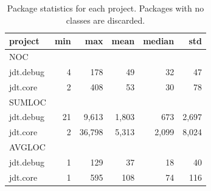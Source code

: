 \begin{table}[!ht]\footnotesize
	\centering
	\begin{tabular}{lrrrrr}
		\toprule
		project & min & max & mean & median & std \\
		\midrule
		NOC\\
		\midrule
		jdt.debug & 4 & 178 & 49 & 32 & 47 \\
		jdt.core & 2 & 408 & 53 & 30 & 78 \\
		\midrule
		SUMLOC\\
		\midrule
		jdt.debug & 21 & 9,613 & 1,803 & 673 & 2,697 \\
		jdt.core & 2 & 36,798 & 5,313 & 2,099 & 8,024 \\
		\midrule
		AVGLOC\\
		\midrule
		jdt.debug & 1 & 129 & 37 & 18 & 40 \\
		jdt.core & 1 & 595 & 108 & 74 & 116 \\
		\bottomrule
	\end{tabular} 
	\caption{Package statistics for each project. Packages with no classes are discarded.}
	\label{tab:package-stats}
\end{table}
 
